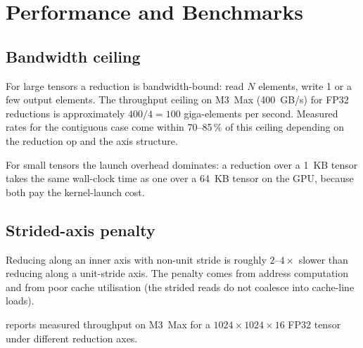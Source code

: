 \section{Performance and Benchmarks}
\label{sec:reductions:perf_benchmarks}

\subsection{Bandwidth ceiling}
\label{ssec:reductions:bw_ceiling}

For large tensors a reduction is bandwidth-bound: read $N$
elements, write 1 or a few output elements. The throughput ceiling
on M3~Max (400~GB/s) for FP32 reductions is approximately
$400 / 4 = 100$ giga-elements per second. Measured rates for the
contiguous case come within 70--85\,\% of this ceiling depending
on the reduction op and the axis structure.

For small tensors the launch overhead dominates: a reduction over
a 1~KB tensor takes the same wall-clock time as one over a 64~KB
tensor on the GPU, because both pay the kernel-launch cost.

\subsection{Strided-axis penalty}
\label{ssec:reductions:strided_penalty}

Reducing along an inner axis with non-unit stride is roughly
$2$--$4\times$ slower than reducing along a unit-stride axis. The
penalty comes from address computation and from poor cache
utilisation (the strided reads do not coalesce into cache-line
loads).

 reports measured throughput
on M3~Max for a $1024 \times 1024 \times 16$ FP32 tensor under
different reduction axes.

